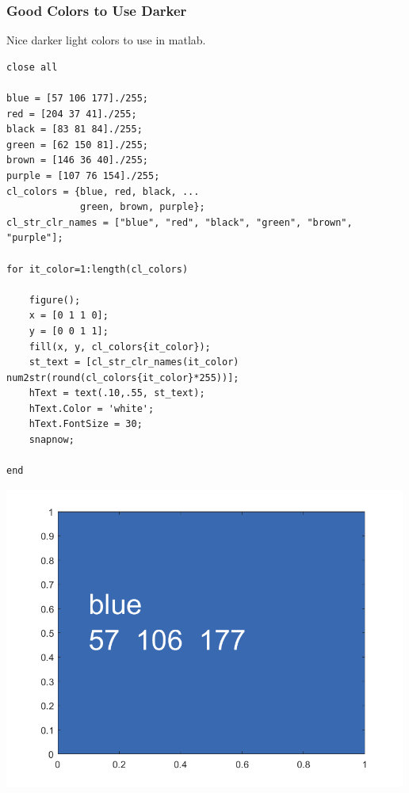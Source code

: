 \documentclass[
]{book}
\begin{document}
\hypertarget{good-colors-to-use-darker}{%
\subsubsection{Good Colors to Use Darker}\label{good-colors-to-use-darker}}

Nice darker light colors to use in matlab.

\begin{verbatim}
close all

blue = [57 106 177]./255;
red = [204 37 41]./255;
black = [83 81 84]./255;
green = [62 150 81]./255;
brown = [146 36 40]./255;
purple = [107 76 154]./255;
cl_colors = {blue, red, black, ...
             green, brown, purple};
cl_str_clr_names = ["blue", "red", "black", "green", "brown", "purple"];

for it_color=1:length(cl_colors)
    
    figure();
    x = [0 1 1 0];
    y = [0 0 1 1];
    fill(x, y, cl_colors{it_color});
    st_text = [cl_str_clr_names(it_color) num2str(round(cl_colors{it_color}*255))];
    hText = text(.10,.55, st_text);
    hText.Color = 'white';
    hText.FontSize = 30; 
    snapnow;
    
end
\end{verbatim}

\includegraphics[width=5.20833in,height=\textheight]{img/fs_color_images/figure_0.png}
\end{document}
